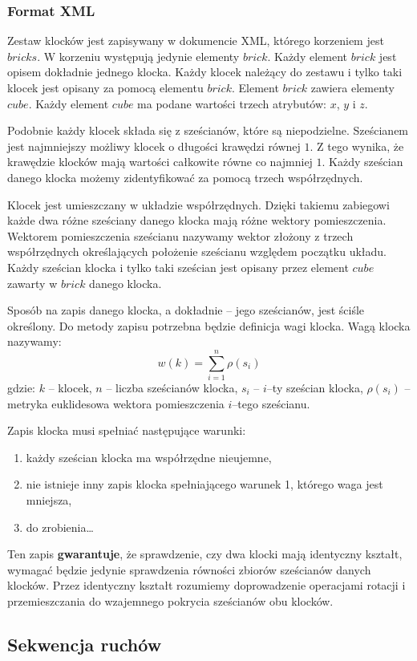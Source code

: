 \documentclass[12pt]{article}
\begin{document}
\subsubsection{Format XML}
Zestaw klocków jest zapisywany w dokumencie XML, którego korzeniem jest
$bricks$. W korzeniu występują jedynie elementy $brick$. Każdy element
$brick$ jest opisem dokładnie jednego klocka. Każdy klocek należący do
zestawu i tylko taki klocek jest opisany za pomocą elementu $brick$.
Element $brick$ zawiera elementy $cube$. Każdy element $cube$ ma podane
wartości trzech atrybutów: $x$, $y$ i $z$.

Podobnie każdy klocek składa się
z sześcianów, które są niepodzielne. Sześcianem jest najmniejszy możliwy
klocek o długości krawędzi równej $1$. Z tego wynika, że krawędzie klocków
mają wartości całkowite równe co najmniej $1$. Każdy sześcian danego
klocka możemy zidentyfikować za pomocą trzech współrzędnych.

Klocek jest
umieszczany w układzie współrzędnych. Dzięki takiemu zabiegowi każde dwa
różne sześciany danego klocka mają różne wektory pomieszczenia. Wektorem
pomieszczenia sześcianu nazywamy wektor złożony z trzech współrzędnych
określających położenie sześcianu względem początku układu. Każdy
sześcian klocka i tylko taki sześcian jest opisany przez element $cube$
zawarty w $brick$ danego klocka.

Sposób na zapis danego klocka, a dokładnie -- jego sześcianów, jest ściśle
określony. Do metody zapisu potrzebna będzie definicja wagi klocka. Wagą
klocka nazywamy:
\begin{equation}
	w(k) = \sum_{i=1}^n \rho (s_i)
\end{equation}
gdzie:
$k$ -- klocek,
$n$ -- liczba sześcianów klocka,
$s_i$ -- $i$--ty sześcian klocka,
$\rho (s_i)$ -- metryka euklidesowa wektora pomieszczenia $i$--tego
sześcianu.

Zapis klocka musi spełniać następujące warunki:
\begin{enumerate}
	\item każdy sześcian klocka ma współrzędne nieujemne,
	\item nie istnieje inny zapis klocka spełniającego warunek 1, którego
		waga jest mniejsza,
	\item do zrobienia\ldots
\end{enumerate}
Ten zapis \textbf{gwarantuje}, że sprawdzenie, czy dwa klocki mają
identyczny kształt, wymagać będzie jedynie sprawdzenia równości zbiorów
sześcianów danych klocków. Przez identyczny kształt rozumiemy doprowadzenie
operacjami rotacji i przemieszczania do wzajemnego pokrycia sześcianów
obu klocków.

\subsection{Sekwencja ruchów}
\end{document}
